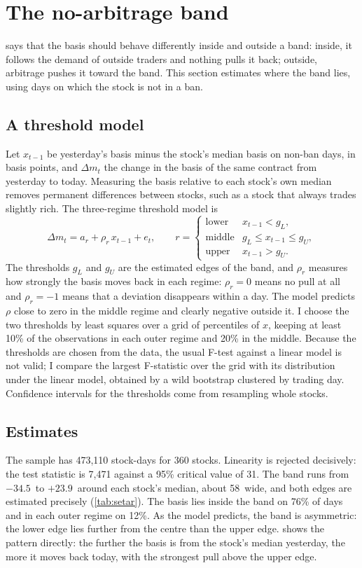 \section{The no-arbitrage band}\label{sec:band}

 says that the basis should behave differently inside and outside a band: inside, it follows the
demand of outside traders and nothing pulls it back; outside, arbitrage pushes it toward the band. This section
estimates where the band lies, using days on which the stock is not in a ban.

\subsection{A threshold model}
Let $x_{t-1}$ be yesterday's basis minus the stock's median basis on non-ban days, in basis points, and $\Delta m_t$ the
change in the basis of the same contract from yesterday to today. Measuring the basis relative to each stock's own median
removes permanent differences between stocks, such as a stock that always trades slightly rich. The three-regime
threshold model is
\begin{equation}\label{eq:setar}
\Delta m_t=a_r+\rho_r\,x_{t-1}+e_t,\qquad
r=\begin{cases}\text{lower} & x_{t-1}<g_L,\\ \text{middle} & g_L\le x_{t-1}\le g_U,\\ \text{upper} & x_{t-1}>g_U.\end{cases}
\end{equation}
The thresholds $g_L$ and $g_U$ are the estimated edges of the band, and $\rho_r$ measures how strongly the basis moves
back in each regime: $\rho_r=0$ means no pull at all and $\rho_r=-1$ means that a deviation disappears within a day.
The model predicts $\rho$ close to zero in the middle regime and clearly negative outside it. I choose the two
thresholds by least squares over a grid of percentiles of $x$, keeping at least 10\% of the observations in each outer
regime and 20\% in the middle. Because the thresholds are chosen from the data, the usual F-test against a linear model
is not valid; I compare the largest F-statistic over the grid with its distribution under the linear model, obtained
by a wild bootstrap clustered by trading day. Confidence intervals for the thresholds come from resampling whole
stocks.

\subsection{Estimates}
The sample has 473,110 stock-days for 360 stocks. Linearity is rejected decisively: the test statistic is 7,471 against
a 95\% critical value of 31. The band runs from $-34.5$\bp\ to $+23.9$\bp\ around each stock's median, about 58\bp\
wide, and both edges are estimated precisely (\cref{tab:setar}). The basis lies inside the band on 76\% of days and in
each outer regime on 12\%. As the model predicts, the band is asymmetric: the lower edge lies further from the centre
than the upper edge. \Cref{fig:bandscatter} shows the pattern directly: the further the basis is from the stock's
median yesterday, the more it moves back today, with the strongest pull above the upper edge.

